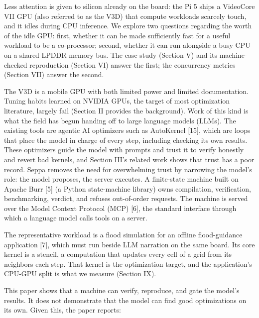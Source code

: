 \documentclass[conference]{IEEEtran}
\begin{document}
Less attention is given to silicon already on the board: the Pi 5 ships
a VideoCore VII GPU (also referred to as the V3D) that compute workloads
scarcely touch, and it idles during CPU inference. We explore two
questions regarding the worth of the idle GPU: first, whether it can be
made sufficiently fast for a useful workload to be a co-processor;
second, whether it can run alongside a busy CPU on a shared LPDDR memory
bus. The case study (Section V) and its machine-checked reproduction
(Section VI) answer the first; the concurrency metrics (Section VII)
answer the second.

The V3D is a mobile GPU with both limited power and limited
documentation. Tuning habits learned on NVIDIA GPUs, the target of most
optimization literature, largely fail (Section II provides the
background). Work of this kind is what the field has begun handing off
to large language models (LLMs). The existing tools are agentic AI
optimizers such as AutoKernel {[}15{]}, which are loops that place the
model in charge of every step, including checking its own results. These
optimizers guide the model with prompts and trust it to verify honestly
and revert bad kernels, and Section III's related work shows that trust
has a poor record. Seppa removes the need for overwhelming trust by
narrowing the model's role: the model proposes, the server executes. A
finite-state machine built on Apache Burr {[}5{]} (a Python
state-machine library) owns compilation, verification, benchmarking,
verdict, and refuses out-of-order requests. The machine is served over
the Model Context Protocol (MCP) {[}6{]}, the standard interface through
which a language model calls tools on a server.

The representative workload is a flood simulation for an offline
flood-guidance application {[}7{]}, which must run beside LLM narration
on the same board. Its core kernel is a stencil, a computation that
updates every cell of a grid from its neighbors each step. That kernel
is the optimization target, and the application's CPU-GPU split is what
we measure (Section IX).

This paper shows that a machine can verify, reproduce, and gate the
model's results. It does not demonstrate that the model can find good
optimizations on its own. Given this, the paper reports:
\end{document}
